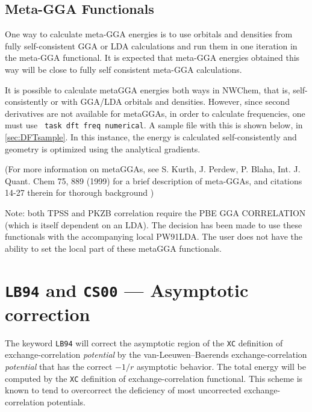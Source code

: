 %



\subsection{Meta-GGA Functionals}


One way to calculate meta-GGA energies is to use
 orbitals and densities 
from fully self-consistent GGA or LDA calculations
and run them in one iteration in the meta-GGA functional.
It is expected that meta-GGA energies obtained
this way will be close to fully self consistent
meta-GGA calculations. 

It is possible to calculate metaGGA energies both ways
in NWChem, that is, self-consistently or with
GGA/LDA orbitals and densities.  However, since second derivatives
are not available for metaGGAs, in order to
calculate frequencies, one must use
\verb+ task dft freq numerical+.
A sample file with this is shown below,
in \ref{sec:DFTsample}.  In this instance, the
energy is calculated self-consistently and geometry is optimized using the analytical gradients.


(For more information on metaGGAs,  see
S. Kurth, J. Perdew, P. Blaha, Int. J. Quant. Chem 75, 889 (1999)
for a brief description of meta-GGAs, and  citations 14-27
therein for thorough background )

Note:  both TPSS and PKZB correlation
require the PBE GGA CORRELATION (which is itself dependent on an LDA).  
The decision has been made to
use these functionals with the accompanying local
PW91LDA.  The user does not have the ability to set
the local part of these metaGGA functionals.


\section{{\tt LB94} and {\tt CS00} --- Asymptotic correction}

The keyword \verb+LB94+ will correct the asymptotic region of 
the \verb+XC+ definition of exchange-correlation {\it potential} by 
the van-Leeuwen--Baerends exchange-correlation {\it potential} that
has the correct $-1/r$ asymptotic behavior.  The total energy will be computed by the 
\verb+XC+ definition of exchange-correlation functional.  This scheme is known to
tend to overcorrect the deficiency of most uncorrected exchange-correlation potentials.

